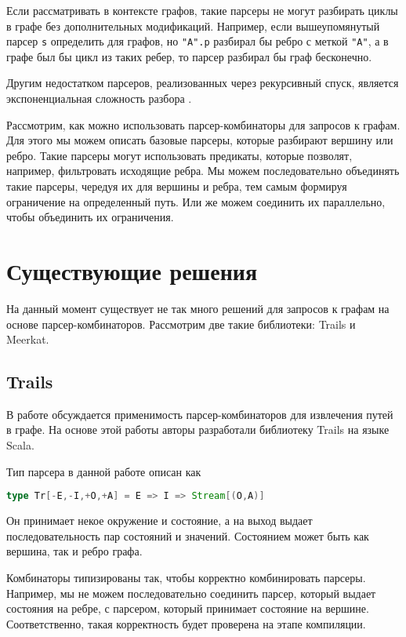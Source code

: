 Если рассматривать в контексте графов, такие парсеры не могут разбирать циклы в графе без дополнительных модификаций. Например, если вышеупомянутый парсер \verb|s| определить для графов, но \texttt{"A".p} разбирал бы ребро с меткой \verb|"A"|, а в графе был бы цикл из таких ребер, то парсер разбирал бы граф бесконечно.

Другим недостатком парсеров, реализованных через рекурсивный спуск, является экспоненциальная сложность разбора \cite{Meerkat}.

Рассмотрим, как можно использовать парсер-комбинаторы для запросов к графам.
Для этого мы можем описать базовые парсеры, которые разбирают вершину или ребро.
Такие парсеры могут использовать предикаты, которые позволят, например, фильтровать исходящие ребра.
Мы можем последовательно объединять такие парсеры, чередуя их для вершины и ребра, тем самым формируя ограничение на определенный путь.
Или же можем соединить их параллельно, чтобы объединить их ограничения.


\section{Существующие решения}

На данный момент существует не так много решений для запросов к графам на основе парсер-комбинаторов.
Рассмотрим две такие библиотеки: Trails и Meerkat.

\subsection{Trails}

В работе \cite{Trails} обсуждается применимость парсер-комбинаторов для извлечения путей в графе. На основе этой работы авторы разработали библиотеку Trails на языке Scala.

Тип парсера в данной работе описан как
\begin{lstlisting}[language=Scala, numbers=none, frame=none]
type Tr[-E,-I,+O,+A] = E => I => Stream[(O,A)] 
\end{lstlisting}
Он принимает некое окружение и состояние, а на выход выдает последовательность пар состояний и значений. Состоянием может быть как вершина, так и ребро графа.

Комбинаторы типизированы так, чтобы корректно комбинировать парсеры. Например, мы не можем последовательно соединить парсер, который выдает состояния на ребре, с парсером, который принимает состояние на вершине. Соответственно, такая корректность будет проверена на этапе компиляции.

